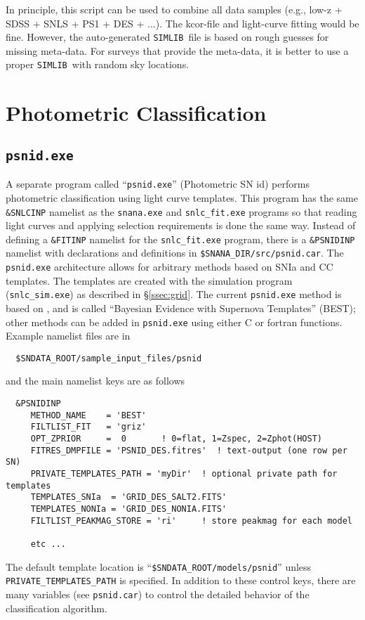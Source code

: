 \documentclass[12pt]{article}
\newcommand{\snfitter}{{\tt snlc\_fit.exe}}
\newcommand{\simexe}{{\tt snlc\_sim.exe}}
\newcommand{\psnid}{{\tt psnid.exe}}
\newcommand{\simlib}{{\tt SIMLIB}}
\begin{document}
In principle, this script can be used to combine all data 
samples (e.g., low-z + SDSS + SNLS + PS1 + DES + ...).
The kcor-file and light-curve fitting would be fine. 
However, the auto-generated \simlib\ file is based on rough
guesses for missing meta-data. For surveys that provide
the meta-data, it is better to use a proper \simlib\
with random sky locations.


   \clearpage
   \section{Photometric Classification }
   \label{sec:photid}


\subsection{\psnid}
\label{subsec:psnid}

A separate program called ``{\psnid}''  (Photometric SN id) 
performs photometric classification using light curve templates.
This program has the same {\tt \&SNLCINP} namelist as
the {\tt snana.exe} and {\snfitter} programs so that
reading light curves and applying selection requirements
is done the same way. Instead of defining a {\tt\&FITINP} namelist
for the {\snfitter} program, there is a {\tt\&PSNIDINP}
namelist with declarations and definitions in
{\tt \$SNANA\_DIR/src/psnid.car}.
The {\psnid} architecture allows for arbitrary methods based 
on SNIa and CC templates. The templates are created with the 
simulation program ({\simexe}) as described in \S\ref{ssec:grid}.
The current {\psnid} method is based on \cite{PSNID_2011},
and is called 
``Bayesian Evidence with Supernova Templates'' (BEST);
other methods can be added in {\psnid} using either
C or fortran functions.
Example namelist files are in
\begin{verbatim}
  $SNDATA_ROOT/sample_input_files/psnid
\end{verbatim}
%
and the main namelist keys are as follows
\begin{verbatim}
  &PSNIDINP
     METHOD_NAME    = 'BEST'
     FILTLIST_FIT   = 'griz'
     OPT_ZPRIOR     =  0       ! 0=flat, 1=Zspec, 2=Zphot(HOST)
     FITRES_DMPFILE = 'PSNID_DES.fitres'  ! text-output (one row per SN)
     PRIVATE_TEMPLATES_PATH = 'myDir'  ! optional private path for templates
     TEMPLATES_SNIa  = 'GRID_DES_SALT2.FITS'
     TEMPLATES_NONIa = 'GRID_DES_NONIA.FITS'
     FILTLIST_PEAKMAG_STORE = 'ri'     ! store peakmag for each model

     etc ...
\end{verbatim}
The default template location is ``{\tt \$SNDATA\_ROOT/models/psnid}''
unless {\tt PRIVATE\_TEMPLATES\_PATH} is specified.
In addition to these control keys, there are many variables 
(see {\tt psnid.car}) to control the detailed behavior
of the classification algorithm.
\end{document}
